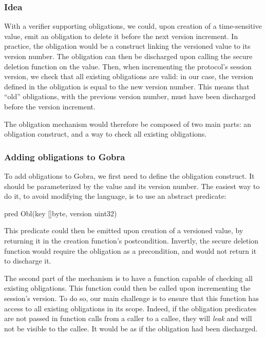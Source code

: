 \subsubsection{Idea}

With a verifier supporting obligations, we could, upon creation of a time-sensitive value, emit an obligation to delete it before the next version increment. 
In practice, the obligation would be a construct linking the versioned value to its version number.
The obligation can then be discharged upon calling the secure deletion function on the value.
Then, when incrementing the protocol's session version, we check that all existing obligations are valid: in our case, the version defined in the obligation is equal to the new version number.
This means that “old” obligations, with the previous version number, must have been discharged before the version increment.

The obligation mechanism would therefore be composed of two main parts: an obligation construct, and a way to check all existing obligations.

\subsubsection{Adding obligations to Gobra}

To add obligations to Gobra, we first need to define the obligation construct.
It should be parameterized by the value and its version number.
The easiest way to do it, to avoid modifying the language, is to use an abstract predicate:
\begin{gobra}
pred Obl(key []byte, version uint32)
\end{gobra}
This predicate could then be emitted upon creation of a versioned value, by returning it in the creation function's postcondition.
Invertly, the secure deletion function would require the obligation as a precondition, and would not return it to discharge it.

The second part of the mechanism is to have a function capable of checking all existing obligations. This function could then be called upon incrementing the session's version.
To do so, our main challenge is to ensure that this function has access to all existing obligations in its scope.
Indeed, if the obligation predicates are not passed in function calls from a caller to a callee, they will \emph{leak} and will not be visible to the callee. It would be as if the obligation had been discharged.


